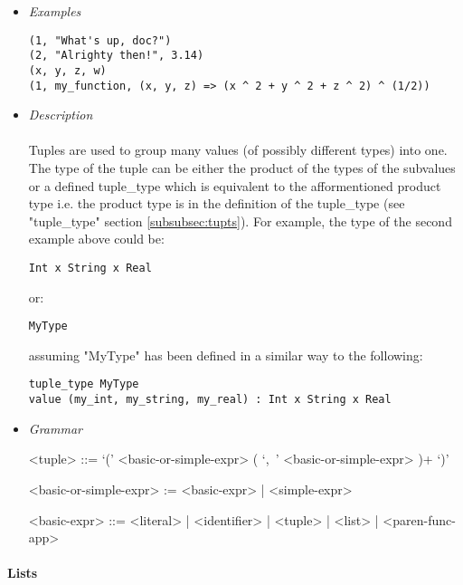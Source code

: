 \documentclass{article}
\begin{document}
\begin{itemize}

\item \textit{Examples}
\begin{verbatim}
(1, "What's up, doc?")
(2, "Alrighty then!", 3.14)
(x, y, z, w)
(1, my_function, (x, y, z) => (x ^ 2 + y ^ 2 + z ^ 2) ^ (1/2))
\end{verbatim}

\item \textit{Description} \\\\
Tuples are used to group many values (of possibly different types) into one.
The type of the tuple can be either the product of the types of the subvalues or a
defined tuple\_type which is equivalent to the afformentioned product type i.e.
the product type is in the definition of the tuple\_type (see "tuple\_type"
section \ref{subsubsec:tupts}). For example, the type of the second example above 
could be:
\begin{verbatim}
Int x String x Real
\end{verbatim}
or:
\begin{verbatim}
MyType
\end{verbatim}
assuming "MyType" has been defined in a similar way to the following:
\begin{verbatim}
tuple_type MyType
value (my_int, my_string, my_real) : Int x String x Real
\end{verbatim}

\item \textit{Grammar}
\begin{grammar}
<tuple> ::= `(' <basic-or-simple-expr> ( `,\ ' <basic-or-simple-expr> )+ `)'

<basic-or-simple-expr> := <basic-expr> | <simple-expr>

<basic-expr> ::= <literal> | <identifier> | <tuple> | <list> | <paren-func-app>
\end{grammar}

\end{itemize}

\paragraph{Lists}
\end{document}
